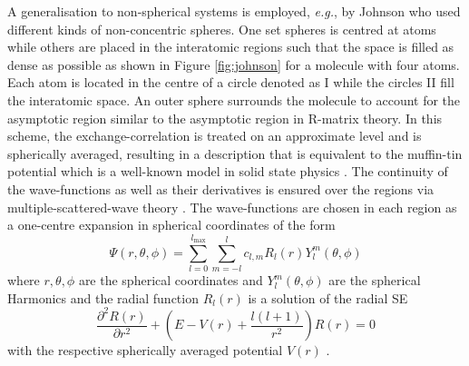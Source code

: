 A generalisation to non-spherical systems is employed, \textit{e.g.}, by Johnson \cite{johnson} who used different kinds of non-concentric spheres.
One set spheres is centred at atoms while others are placed in the interatomic regions such that the space is filled as dense as possible as shown in Figure \ref{fig:johnson} for a molecule with four atoms.
Each atom is located in the centre of a circle denoted as I while the circles II fill the interatomic space.
An outer sphere surrounds the molecule to account for the asymptotic region similar to the asymptotic region in R-matrix theory.
In this scheme, the exchange-correlation is treated on an approximate level \cite{slaterJohn} and is spherically averaged, resulting in a description that is equivalent to the muffin-tin potential which is a well-known model in solid state physics \cite{MufTin,MufTin1}.
The continuity of the wave-functions as well as their derivatives is ensured over the regions via multiple-scattered-wave theory \cite{johnson}.
The wave-functions are chosen in each region as a one-centre expansion in spherical coordinates of the form
\begin{equation} \label{eq:radSE}
\Psi(r, \theta, \phi) =\sum_{l=0}^{l_\text{max}}\sum_{m=-l}^l c_{l,m} R_l(r) Y_l^m(\theta, \phi)
\end{equation}
where $r,\theta,\phi$ are the spherical coordinates and $Y_l^m(\theta,\phi)$ are the spherical Harmonics \cite{Lifschitz} and the radial function $R_l(r)$ is a solution of the radial SE 
\begin{equation} \label{eq:radSEeq}
\frac{\partial^2 R(r)}{\partial r^2} + \left( E-V(r) + \frac{l(l+1)}{r^2} \right)R(r)=0
\end{equation}
with the respective spherically averaged potential $V(r)$ \cite{johnson}.

